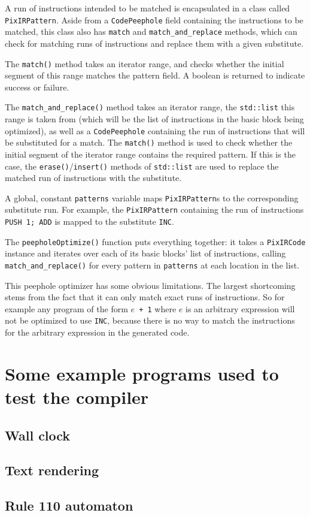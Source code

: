 \documentclass[11pt,a4paper]{scrartcl}
\begin{document}
A run of instructions intended to be matched is encapsulated in a class called \verb|PixIRPattern|. Aside from a \verb|CodePeephole| field containing the instructions to be matched, this class also has \verb|match| and \verb|match_and_replace| methods, which can check for matching runs of instructions and replace them with a given substitute.

The \verb|match()| method takes an iterator range, and checks whether the initial segment of this range matches the pattern field. A boolean is returned to indicate success or failure.

The \verb|match_and_replace()| method takes an iterator range, the \verb|std::list| this range is taken from (which will be the list of instructions in the basic block being optimized), as well as a \verb|CodePeephole| containing the run of instructions that will be substituted for a match. The \verb|match()| method is used to check whether the initial segment of the iterator range contains the required pattern. If this is the case, the \verb|erase()|/\verb|insert()| methods of \verb|std::list| are used to replace the matched run of instructions with the substitute.

A global, constant \verb|patterns| variable maps \verb|PixIRPattern|s to the corresponding substitute run. For example, the \verb|PixIRPattern| containing the run of instructions \verb|PUSH 1; ADD| is mapped to the substitute \verb|INC|.

The \verb|peepholeOptimize()| function puts everything together: it takes a \verb|PixIRCode| instance and iterates over each of its basic blocks' list of instructions, calling \verb|match_and_replace()| for every pattern in \verb|patterns| at each location in the list.

This peephole optimizer has some obvious limitations. The largest shortcoming stems from the fact that it can only match exact runs of instructions. So for example any program of the form $e$\verb| + 1| where $e$ is an arbitrary expression will not be optimized to use \verb|INC|, because there is no way to match the instructions for the arbitrary expression in the generated code.

\newpage

\section{Some example programs used to test the compiler}

\subsection{Wall clock}

\subsection{Text rendering}

\subsection{Rule 110 automaton}

\newpage



\end{document}
